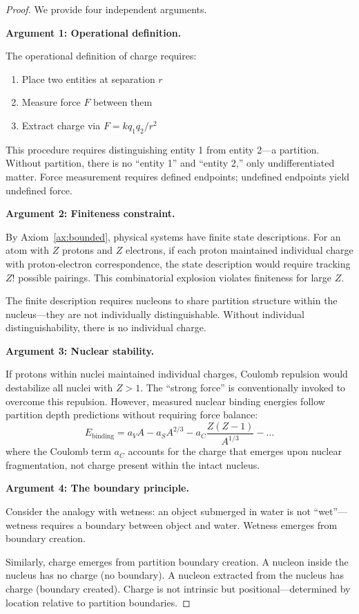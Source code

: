\documentclass[twocolumn,10pt,a4paper]{article}
\theoremstyle{definition}
\theoremstyle{remark}
\begin{document}
\begin{proof}
We provide four independent arguments.

\textbf{Argument 1: Operational definition.}

The operational definition of charge requires:
\begin{enumerate}
    \item Place two entities at separation $r$
    \item Measure force $F$ between them
    \item Extract charge via $F = kq_1q_2/r^2$
\end{enumerate}

This procedure requires distinguishing entity 1 from entity 2---a partition. Without partition, there is no ``entity 1'' and ``entity 2,'' only undifferentiated matter. Force measurement requires defined endpoints; undefined endpoints yield undefined force.

\textbf{Argument 2: Finiteness constraint.}

By Axiom~\ref{ax:bounded}, physical systems have finite state descriptions. For an atom with $Z$ protons and $Z$ electrons, if each proton maintained individual charge with proton-electron correspondence, the state description would require tracking $Z!$ possible pairings. This combinatorial explosion violates finiteness for large $Z$.

The finite description requires nucleons to share partition structure within the nucleus---they are not individually distinguishable. Without individual distinguishability, there is no individual charge.

\textbf{Argument 3: Nuclear stability.}

If protons within nuclei maintained individual charges, Coulomb repulsion would destabilize all nuclei with $Z > 1$. The ``strong force'' is conventionally invoked to overcome this repulsion. However, measured nuclear binding energies follow partition depth predictions without requiring force balance:
\begin{equation}
    E_{\text{binding}} = a_V A - a_S A^{2/3} - a_C \frac{Z(Z-1)}{A^{1/3}} - \ldots
\end{equation}
where the Coulomb term $a_C$ accounts for the charge that emerges upon nuclear fragmentation, not charge present within the intact nucleus.

\textbf{Argument 4: The boundary principle.}

Consider the analogy with wetness: an object submerged in water is not ``wet''---wetness requires a boundary between object and water. Wetness emerges from boundary creation.

Similarly, charge emerges from partition boundary creation. A nucleon inside the nucleus has no charge (no boundary). A nucleon extracted from the nucleus has charge (boundary created). Charge is not intrinsic but positional---determined by location relative to partition boundaries.
\end{proof}
\end{document}

